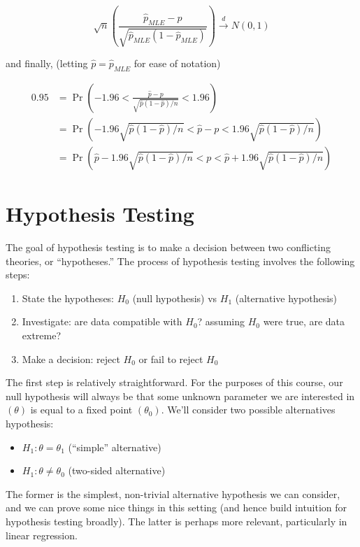 \documentclass[
  letterpaper,
  DIV=11,
  numbers=noendperiod]{scrreprt}
\begin{document}
\[
\sqrt{n}\left(\frac{\hat{p}_{MLE} - p}{\sqrt{\hat{p}_{MLE}(1-\hat{p}_{MLE})}}\right) \overset{d}{\to} N(0, 1)
\]

and finally, (letting \(\hat{p} = \hat{p}_{MLE}\) for ease of notation)

\begin{align*}
    0.95 & = \Pr\left(-1.96 < \frac{\hat{p} - p}{\sqrt{\hat{p}(1-\hat{p})/n}}  < 1.96\right)  \\
    & = \Pr\left(-1.96\sqrt{\hat{p}(1-\hat{p})/n} < \hat{p} - p  < 1.96\sqrt{\hat{p}(1-\hat{p})/n}\right) \\
    & = \Pr\left(\hat{p} -1.96\sqrt{\hat{p}(1-\hat{p})/n} <  p  < \hat{p} + 1.96\sqrt{\hat{p}(1-\hat{p})/n}\right)
\end{align*}


\chapter{Hypothesis Testing}\label{hypothesis-testing}

The goal of hypothesis testing is to make a decision between two
conflicting theories, or ``hypotheses.'' The process of hypothesis
testing involves the following steps:

\begin{enumerate}
\def\labelenumi{\arabic{enumi}.}
\item
  State the hypotheses: \(H_0\) (null hypothesis) vs \(H_1\)
  (alternative hypothesis)
\item
  Investigate: are data compatible with \(H_0\)? assuming \(H_0\) were
  true, are data extreme?
\item
  Make a decision: reject \(H_0\) or fail to reject \(H_0\)
\end{enumerate}

The first step is relatively straightforward. For the purposes of this
course, our null hypothesis will always be that some unknown parameter
we are interested in \((\theta)\) is equal to a fixed point
\((\theta_0)\). We'll consider two possible alternatives hypothesis:

\begin{itemize}
\item
  \(H_1: \theta = \theta_1\) (``simple'' alternative)
\item
  \(H_1: \theta \neq \theta_0\) (two-sided alternative)
\end{itemize}

The former is the simplest, non-trivial alternative hypothesis we can
consider, and we can prove some nice things in this setting (and hence
build intuition for hypothesis testing broadly). The latter is perhaps
more relevant, particularly in linear regression.
\end{document}
